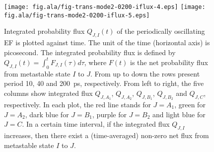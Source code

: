 \documentclass[aip,jcp,a4paper,preprint,onecolumn]{revtex4-1}
\begin{document}
\begin{figure}
  \texttt{[image: fig.ala/fig-trans-mode2-0200-iflux-4.eps]}
  \texttt{[image: fig.ala/fig-trans-mode2-0200-iflux-5.eps]}\\
  \caption{
    Integrated probability flux $Q_{J,I}(t)$ of the periodically
    oscillating EF is plotted against time. The unit of the
    time (horizontal axis) is picosecond.
    The integrated
    probability flux is defined by $Q_{J,I}(t) = \int_0^t F_{J,I}(\tau) d\tau$, where
    $F(t)$ is the net probability flux from metastable state $I$ to $J$.
    From up to down the rows present period 10, 40 and 200~ps, respectively.
    From left to right, the five
    columns show integrated flux $Q_{J,A_1}$, $Q_{J,A_2}$,
    $Q_{J,B_1}$, $Q_{J,B_2}$ and $Q_{J,C}$, respectively. In each plot,
    the red line stands for $J=A_1$, green for $J=A_2$, dark blue for $J=B_1$,
    purple for $J=B_2$ and light blue for $J=C$. In a certain time interval,
    if the integrated flux $Q_{J,I}$ increases, then there exist a (time-averaged)
    non-zero net flux from metastable state $I$ to $J$.
  }
  \label{fig:tmp10}
\end{figure}
\end{document}
